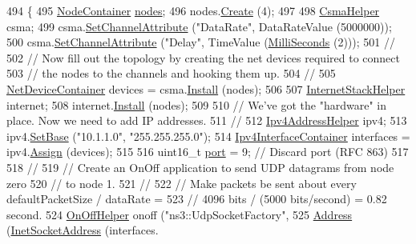 \begin{DoxyCode}
494 \{
495   \hyperlink{classns3_1_1NodeContainer}{NodeContainer} \hyperlink{visualizer-ideas_8txt_a3e1b3808014a2c68ab0cd0182e041be2}{nodes};
496   nodes.\hyperlink{classns3_1_1NodeContainer_a787f059e2813e8b951cc6914d11dfe69}{Create} (4);
497 
498   \hyperlink{classns3_1_1CsmaHelper}{CsmaHelper} csma;
499   csma.\hyperlink{classns3_1_1CsmaHelper_a886d900b2fe44433e0b81752dea7e7f1}{SetChannelAttribute} (\textcolor{stringliteral}{"DataRate"}, DataRateValue (5000000));
500   csma.\hyperlink{classns3_1_1CsmaHelper_a886d900b2fe44433e0b81752dea7e7f1}{SetChannelAttribute} (\textcolor{stringliteral}{"Delay"}, TimeValue (\hyperlink{group__timecivil_gaf26127cf4571146b83a92ee18679c7a9}{MilliSeconds} (2)));
501   \textcolor{comment}{//}
502   \textcolor{comment}{// Now fill out the topology by creating the net devices required to connect}
503   \textcolor{comment}{// the nodes to the channels and hooking them up.}
504   \textcolor{comment}{//}
505   \hyperlink{classns3_1_1NetDeviceContainer}{NetDeviceContainer} devices = csma.\hyperlink{classns3_1_1CsmaHelper_af79a91372595230b0817200270ab84e7}{Install} (nodes);
506 
507   \hyperlink{classns3_1_1InternetStackHelper}{InternetStackHelper} internet;
508   internet.\hyperlink{classns3_1_1InternetStackHelper_a6645b412f31283d2d9bc3d8a95cebbc0}{Install} (nodes);
509 
510   \textcolor{comment}{// We've got the "hardware" in place.  Now we need to add IP addresses.}
511   \textcolor{comment}{//}
512   \hyperlink{classns3_1_1Ipv4AddressHelper}{Ipv4AddressHelper} ipv4;
513   ipv4.\hyperlink{classns3_1_1Ipv4AddressHelper_acf7b16dd25bac67e00f5e25f90a9a035}{SetBase} (\textcolor{stringliteral}{"10.1.1.0"}, \textcolor{stringliteral}{"255.255.255.0"});
514   \hyperlink{classns3_1_1Ipv4InterfaceContainer}{Ipv4InterfaceContainer} interfaces = ipv4.\hyperlink{classns3_1_1Ipv4AddressHelper_af8e7f4a1a7e74c00014a1eac445a27af}{Assign} (devices);
515 
516   uint16\_t \hyperlink{dsdv-manet_8cc_a8e0798404bf2cf5dabb84c5ba9a4f236}{port} = 9;   \textcolor{comment}{// Discard port (RFC 863)}
517 
518   \textcolor{comment}{//}
519   \textcolor{comment}{// Create an OnOff application to send UDP datagrams from node zero}
520   \textcolor{comment}{// to node 1.}
521   \textcolor{comment}{//}
522   \textcolor{comment}{// Make packets be sent about every defaultPacketSize / dataRate = }
523   \textcolor{comment}{// 4096 bits / (5000 bits/second) = 0.82 second.}
524   \hyperlink{classns3_1_1OnOffHelper}{OnOffHelper} onoff (\textcolor{stringliteral}{"ns3::UdpSocketFactory"}, 
525                      \hyperlink{classns3_1_1Address}{Address} (\hyperlink{classns3_1_1InetSocketAddress}{InetSocketAddress} (interfaces.

\end{DoxyCode}
